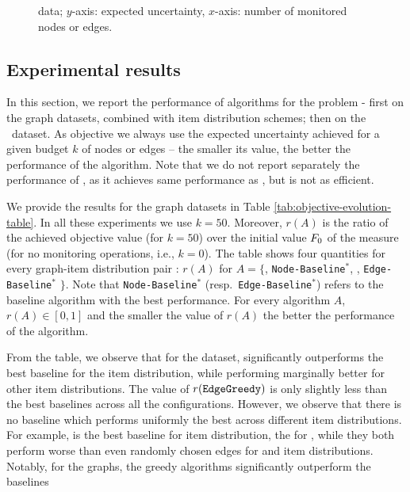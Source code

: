 \begin{figure}
\begin{subfigure}[b]{0.23\textwidth}
\caption{{\edgeproblem}}
\label{fig:hubway_edges}
\end{subfigure}
\caption{{\hubway} data; $y$-axis: expected uncertainty, $x$-axis: number of monitored nodes or edges.}
\end{figure}



\subsection{Experimental results}
In this section, we report the   
performance of algorithms for the {\mcproblem} problem -
first on the graph datasets, combined with item distribution schemes;
then on the \hubway\ dataset.
As objective we always use the expected uncertainty
achieved for a given budget $k$ of nodes or edges -- the smaller its value,
the better the performance of the algorithm.
Note that we do not report separately the performance of \edgeDP, as it achieves
same performance as \edgegreedy, but is not as efficient.


We provide the results for the graph datasets in Table \ref{tab:objective-evolution-table}. 
In all these experiments we use $k=50$.
Moreover, $r(A)$ is the ratio of the achieved objective value (for $k=50$) over
the initial value $F_0$ of the measure 
(for no monitoring operations, i.e., $k=0$).
The table shows four quantities for every graph-item distribution pair
: $r(A)$ for $A=\{${\nodegreedy}, {\tt Node-Baseline}$^\ast$, {\edgegreedy}, {\tt Edge-Baseline}$^\ast$ $\}$.
Note that {\tt Node-Baseline}$^\ast$ (resp.\ {\tt Edge-Baseline}$^\ast$) refers to the baseline 
algorithm with the best performance.
For every algorithm $A$, $r(A)\in[0,1]$ and the smaller the value of $r(A)$ the better the performance of the algorithm.
 
From the table, we observe that for 
the {\autonomoussystems} dataset,  {\nodegreedy}  significantly outperforms the best
baseline for the {\ego} item distribution, while performing marginally better for other item distributions.
The value of  $r({{\texttt{EdgeGreedy}}})$ is only slightly less than
the best baselines across all the configurations. However, we observe that there is no baseline
which performs uniformly the best across different item distributions. For example,  {\edgebetweenness}
is the best baseline for {\direct} item distribution, the {\edgenumitems} for {\ego}, while they both
perform worse than even randomly chosen edges for {\uniform} and {\inverse} item distributions.
Notably, for the {\geo} graphs, the greedy algorithms significantly outperform the baselines


